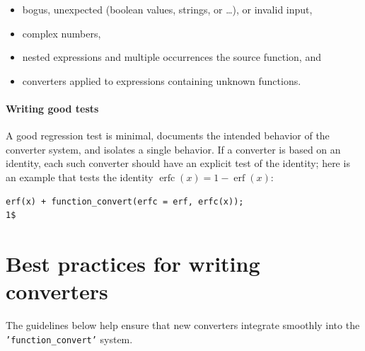 \documentclass[12pt,fleqn]{extarticle}
\newcommand{\ttq}[1]{\texttt{'#1'}}
\newcommand{\funconvert}{\ttq{function\_convert}{ }}
\newenvironment{maximabox}
  {\begin{tcolorbox}[
      breakable,
      enhanced,
      colback=white,
      colframe=black!8,
      boxrule=0pt,
      borderline west={2.2pt}{0pt}{black!25},
      arc=1pt,
      left=11pt,
      right=7pt,
      top=9pt,
      bottom=9pt,
      before skip=14pt,
      after skip=14pt
    ]}
  {\end{tcolorbox}}
\DeclareMathOperator{\erf}{erf}
\DeclareMathOperator{\erfc}{erfc}
\begin{document}
\begin{itemize}
\item bogus, unexpected (boolean values, strings, or \dots),  or invalid input,
  \item complex numbers,
  \item nested expressions and multiple occurrences the source function, and
  \item  converters applied to expressions containing unknown functions.
\end{itemize}

\paragraph{Writing good tests} A good regression test is minimal, documents the intended behavior of the converter system, and  isolates a single behavior. If a converter is based on an identity, each such converter should have an explicit test of the identity; here is an example that tests the identity 
$\erfc(x) = 1-\erf(x)$:
\begin{maximabox}
\begin{verbatim}
erf(x) + function_convert(erfc = erf, erfc(x));
1$
\end{verbatim}
\end{maximabox}

\section{Best practices for writing converters}

 The guidelines below help ensure that new converters integrate smoothly into
the \funconvert system.
\end{document}
